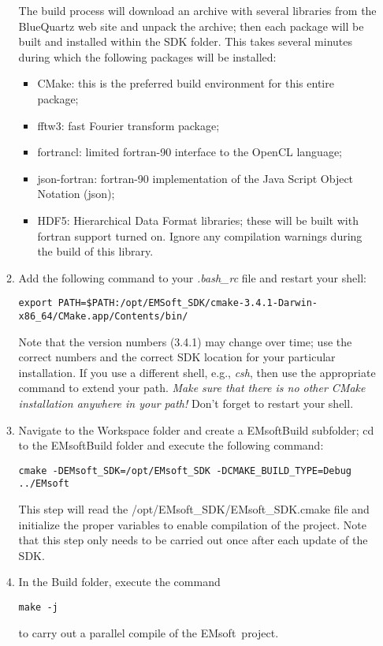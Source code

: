 \documentclass[11pt]{amsart}
\newcommand{\ems}{\textsf{EMsoft}}
\begin{document}
\begin{enumerate}
\begin{enumerate}
The build process will download an archive with several libraries from the BlueQuartz web site and unpack the archive; then each package will be 
built and installed within the SDK folder.  This takes several minutes during which the following packages will be installed:
\begin{itemize}
\item CMake: this is the preferred build environment for this entire package;
\item fftw3: fast Fourier transform package;
\item fortrancl: limited fortran-90 interface to the OpenCL language;
\item json-fortran: fortran-90 implementation of the Java Script Object Notation (json);
\item HDF5: Hierarchical Data Format libraries; these will be built with fortran support turned on.  Ignore any compilation warnings during 
the build of this library.
\end{itemize}
\item Add the following command to your \textit{.bash\_rc} file and restart your shell:
{\small
\begin{verbatim}
export PATH=$PATH:/opt/EMSoft_SDK/cmake-3.4.1-Darwin-x86_64/CMake.app/Contents/bin/
\end{verbatim}}
Note that the version numbers (3.4.1) may change over time; use the correct numbers and the correct SDK location for your particular installation. If you use
a different shell, e.g., \textit{csh}, then use the appropriate command to extend your path.  \textit{Make sure that there is no other CMake
installation anywhere in your path!}  Don't forget to restart your shell.
\item Navigate to the \textsf{Workspace} folder and create a \textsf{EMsoftBuild} subfolder; cd to the \textsf{EMsoftBuild} folder and execute the 
following command:
{\small
\begin{verbatim}
cmake -DEMsoft_SDK=/opt/EMsoft_SDK -DCMAKE_BUILD_TYPE=Debug ../EMsoft
\end{verbatim}}
This step will read the \textsf{/opt/EMsoft\_SDK/EMsoft\_SDK.cmake} file and initialize the proper variables to enable compilation of the project.
Note that this step only needs to be carried out once after each update of the SDK.
\item In the \textsf{Build} folder, execute the command
{\small
\begin{verbatim}
make -j
\end{verbatim}}
to carry out a parallel compile of the \ems\ project.
\end{enumerate}


\end{enumerate}
\end{document}
